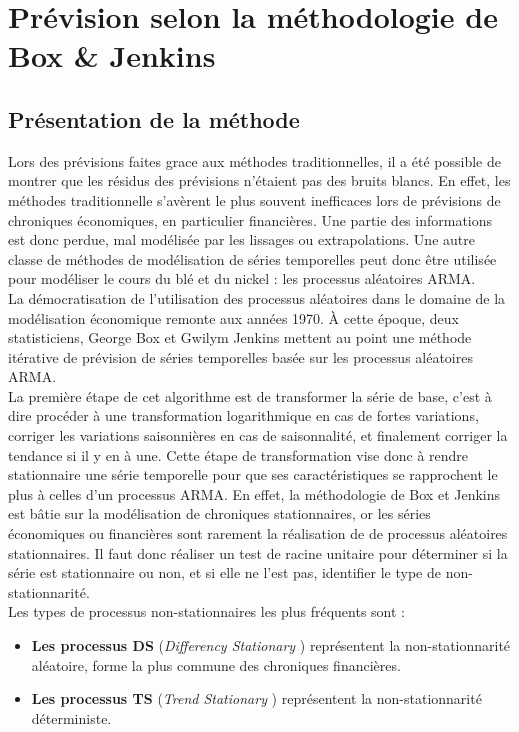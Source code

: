 \section{Prévision selon la méthodologie de Box \& Jenkins}\label{sec:bj}
\subsection{Présentation de la méthode}
Lors des prévisions faites grace aux méthodes traditionnelles, il a été possible de montrer que les résidus des prévisions n'étaient pas des bruits blancs. En effet, 
les méthodes traditionnelle s'avèrent le plus souvent inefficaces lors de prévisions de chroniques économiques, en particulier financières. Une partie des informations est 
donc perdue, mal modélisée par les lissages ou extrapolations. Une autre classe de méthodes de modélisation de séries temporelles peut donc être utilisée pour modéliser le 
cours du blé et du nickel : les processus aléatoires ARMA.\\[11pt]
La démocratisation de l'utilisation des processus aléatoires dans le domaine de la modélisation économique remonte aux années 1970. À cette époque, deux statisticiens, 
George Box et Gwilym Jenkins mettent au point une méthode itérative de prévision de séries temporelles basée sur les processus aléatoires ARMA. \\[11pt]
La première étape de cet algorithme est de transformer la série de base, c'est à dire procéder à une transformation logarithmique en cas de fortes variations, corriger les 
variations saisonnières en cas de saisonnalité, et finalement corriger la tendance si il y en à une. Cette étape de transformation vise donc à rendre stationnaire une 
série temporelle pour que ses caractéristiques se rapprochent le plus à celles d'un processus ARMA. En effet, la méthodologie de Box et Jenkins est bâtie sur la 
modélisation de chroniques stationnaires, or les séries économiques ou financières sont rarement la réalisation de de processus aléatoires stationnaires. Il faut donc 
réaliser un test de racine unitaire pour déterminer si la série est stationnaire ou non, et si elle ne l'est pas, identifier le type de non-stationnarité.\\[11pt]
Les types de processus non-stationnaires les plus fréquents sont :
\begin{itemize}
    \item \textbf{Les processus DS}  (\textit{Differency Stationary} ) représentent la non-stationnarité aléatoire, forme la plus commune des chroniques financières.
    \item \textbf{Les processus TS}  (\textit{Trend Stationary} ) représentent la non-stationnarité déterministe.
\end{itemize}
